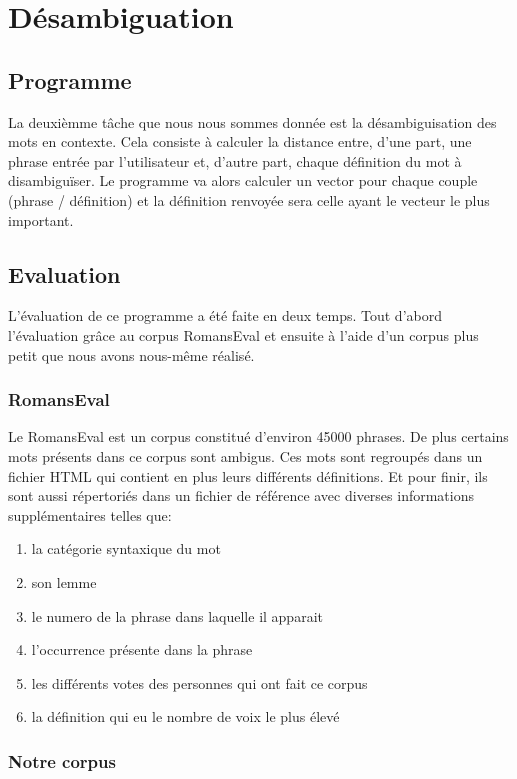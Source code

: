 \section{Désambiguation}
\subsection{Programme}

La deuxièmme tâche que nous nous sommes donnée est la désambiguisation des mots
en contexte. Cela consiste à calculer la distance entre, d'une part, une
phrase entrée par l'utilisateur et, d'autre part, chaque définition du mot à
disambiguïser. Le programme va alors calculer un vector pour chaque couple
(phrase / définition) et la définition renvoyée sera celle ayant le vecteur le
plus important.



\subsection{Evaluation}

L'évaluation de ce programme a été faite en deux temps. Tout d'abord 
l'évaluation grâce au corpus RomansEval et ensuite à l'aide d'un corpus plus 
petit que nous avons nous-même réalisé.

\subsubsection{RomansEval}

Le RomansEval est un corpus constitué d'environ 45000 phrases. De plus certains 
mots présents dans ce corpus sont ambigus. Ces mots sont regroupés dans un 
fichier HTML qui contient en plus leurs différents définitions. Et pour 
finir, ils sont aussi répertoriés dans un fichier de référence avec diverses 
informations supplémentaires telles que:

\begin{enumerate}
 \item la catégorie syntaxique du mot
 \item son lemme
 \item le numero de la phrase dans laquelle il apparait
 \item l'occurrence présente dans la phrase
 \item les différents votes des personnes qui ont fait ce corpus
 \item la définition qui eu le nombre de voix le plus élevé
 \end{enumerate}


 
\subsubsection{Notre corpus}



